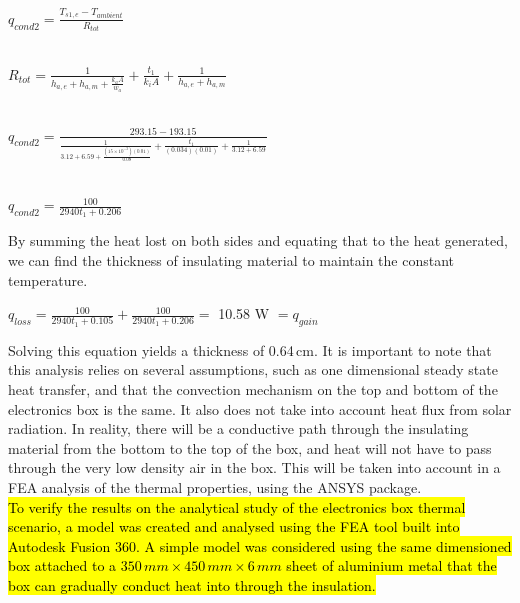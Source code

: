 \begin{center}
 $q_{cond2} = \frac{T_{s1,e}-T_{ambient}}{R_{tot}} $\\
 
 \ 
 
 $R_{tot} = \frac{1}{h_{a,e}+h_{a,m}+\frac{k_{a}A}{w_{a}}} + \frac{t_{1}}{k_{i}A} + \frac{1}{h_{a,e}+h_{a,m}}  $\\
 
 \
 \ 
 
 $q_{cond2} = \frac{293.15 - 193.15}{\frac{1}{3.12+6.59+\frac{(15\times10^{-3})(0.01)}{0.08}} + \frac{t_{1}}{(0.034)(0.01)} + \frac{1}{3.12+6.59}} $\\
 
 \  
 \ 
 
 $q_{cond2} = \frac{100}{2940t_{1}+0.206} $\\
 
\end{center}

By summing the heat lost on both sides and equating that to the heat generated, we can find the thickness of insulating material to maintain the constant temperature. \\

\begin{center}
 $q_{loss} = \frac{100}{2940t_{1}+0.105} + \frac{100}{2940t_{1}+0.206} =$ 
10.58 W
$= q_{gain} $\\
\end{center}

Solving this equation yields a thickness of 0.64\,cm. It is important to note that this analysis relies on several assumptions, such as one dimensional steady state heat transfer, and that the convection mechanism on the top and bottom of the electronics box is the same. It also does not take into account heat flux from solar radiation. In reality, there will be a conductive path through the insulating material from the bottom to the top of the box, and heat will not have to pass through the very low density air in the box. This will be taken into account in a FEA analysis of the thermal properties, using the ANSYS package. \\

\hl{To verify the results on the analytical study of the electronics box thermal scenario, a model was created and analysed using the FEA tool built into Autodesk Fusion 360. A simple model was considered using the same dimensioned box attached to a $350 \,mm \times 450\,mm \times 6\,mm$ sheet of aluminium metal that the box can gradually conduct heat into through the insulation.} \\


